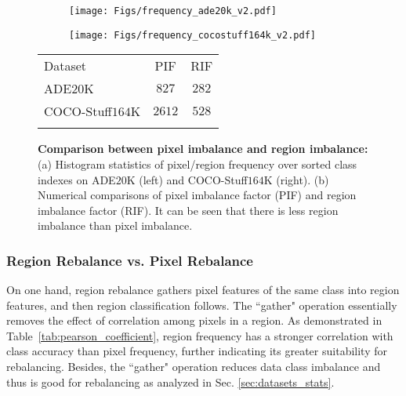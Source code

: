 \documentclass[final]{cvpr}
\begin{document}
\begin{figure*} 
\begin{center}
\begin{minipage}[t]{0.66\textwidth}
\footnotesize
\begin{center}
\begin{subfigure}[b]{0.5\linewidth}
\centering
\hspace{-12.5mm}
\texttt{[image: Figs/frequency\_ade20k\_v2.pdf]}
\end{subfigure}\begin{subfigure}[b]{0.5\linewidth}
\centering
\hspace{-12mm}
\texttt{[image: Figs/frequency\_cocostuff164k\_v2.pdf]}
\end{subfigure}
\end{center}
\end{minipage}
\begin{minipage}[t]{0.3\textwidth} 
\vspace{-1.2in}
\centering
\footnotesize
\setlength{\tabcolsep}{10pt}
\renewcommand{\arraystretch}{1.8}
{
\begin{tabular}{l|cc}
\shline
Dataset &PIF &RIF \\
\shline
ADE$20$K          &$827$  &$282$ \\
COCO-Stuff$164$K  &$2612$ &$528$ \\
\shline
\end{tabular}
}
\label{tab:statistics_imbalance}
\end{minipage}
\end{center}
\vspace{-0.22in}
\caption{
\textbf{Comparison between pixel imbalance and region imbalance:}
(a) Histogram statistics of pixel/region frequency over sorted class indexes on ADE$20$K (left) and COCO-Stuff$164$K (right).
(b) Numerical comparisons of
pixel imbalance factor (PIF) and region imbalance factor (RIF). It can be seen that there is less region imbalance than pixel imbalance.}
\label{fig:data_imbalance_seg}
\vspace{-0.15in}
\end{figure*}


\vspace{-0.1in}
\subsubsection{Region Rebalance vs. Pixel Rebalance}
\label{sec:region_rebalance_analysis}
On one hand, region rebalance gathers pixel features of the same class into region features, and then region classification follows. The ``gather" operation essentially removes the effect of correlation among pixels in a region. As demonstrated in Table~\ref{tab:pearson_coefficient}, region frequency has a stronger correlation with class accuracy than pixel frequency, further indicating its greater suitability for rebalancing. Besides, the ``gather" operation reduces data class imbalance and thus is good for rebalancing as analyzed in Sec. \ref{sec:datasets_stats}. 
\end{document}

